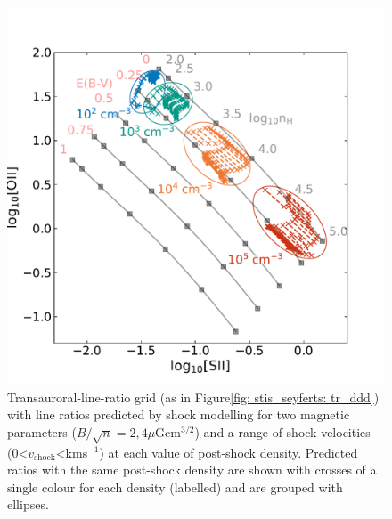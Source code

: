 \begin{figure}
    \includegraphics[width=\linewidth]{figures/tr_grid_shock_modelling/tr_shocks_ddd_v_bn2_bn4.pdf}
    \caption[Transauroral-line-ratio grid for shock models of varying magnetic parameters and a range of shock velocities.]{Transauroral-line-ratio grid (as in Figure\;\ref{fig: stis_seyferts: tr_ddd}) with line ratios predicted by shock modelling for two magnetic parameters ($B/\sqrt{n}=2,4$\;$\mu$G\;cm$^{3/2}$) and a range of shock velocities (0\;\textless\;$v_\mathrm{shock}$\;\textless{}\;km\;s$^{-1}$) at each value of post-shock density. Predicted ratios with the same post-shock density are shown with crosses of a single colour for each density (labelled) and are grouped with ellipses.}
    \label{fig: tr_grid_shock_modelling: tr_shock_ddd_v_bn_vary}
\end{figure}